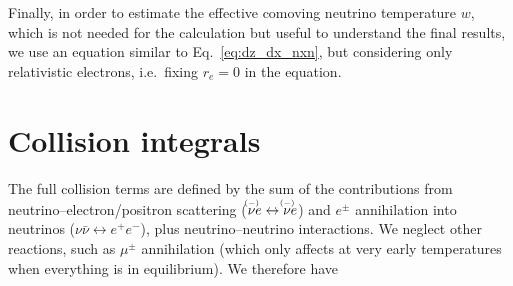 \documentclass[notitlepage,nofootinbib,showpacs,preprintnumbers,amsmath,amssymb,superscriptaddress,prd,onecolumn]{revtex4-1}
\newcommand{\nua}[1]{\ensuremath{\rlap{\kern-2.5pt\ensuremath{\overset{\scriptscriptstyle(-)}{\phantom{\nu}}}}{\ensuremath{{\nu}_{#1}}}}}
\begin{document}
Finally, in order to estimate the effective comoving neutrino temperature $w$, which is
not needed for the calculation but useful to understand the final results,
we use an equation similar to Eq.~\eqref{eq:dz_dx_nxn},
but considering only relativistic electrons, i.e.\ fixing $r_e=0$ in the equation.


\section{Collision integrals}
\label{sec:collint}
The full collision terms are defined by the sum
of the contributions from neutrino--electron/positron scattering
($\nua{} e\leftrightarrow \nua{} e$)
and
$e^\pm$ annihilation into neutrinos ($\nu\bar\nu\leftrightarrow e^+e^-$),
plus neutrino--neutrino interactions.
We neglect other reactions, such as $\mu^\pm$ annihilation (which only affects at very early temperatures when everything is in equilibrium).
We therefore have \cite{deSalas:2016ztq,Bennett:2020zkv}
%
\end{document}
